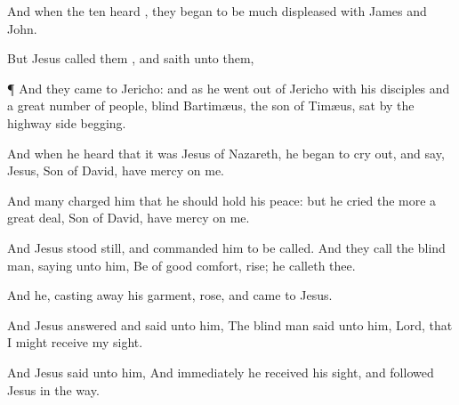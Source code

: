 {

And
when the
ten
heard
{}, they
began to be much
displeased
with
James
and
John.

But
Jesus
called
them
{}, and
saith unto
them,
{}





\par }{\PP {}¶
And they
came
to
Jericho:
and
as
he went
out
of
Jericho
with
his
disciples
and
a
great number of
people,
blind
Bartimæus, the
son of
Timæus,
sat
by the highway
side
begging.

And when he
heard
that it
was
Jesus of
Nazareth, he
began to cry
out,
and
say,
Jesus,
{}
Son of
David, have mercy
on
me.

And
many
charged
him
that he should hold his
peace:
but he
cried the
more a great
deal,
{}
Son of
David, have mercy
on
me.

And
Jesus stood
still, and
commanded
him to be
called.
And they
call the blind
man,
saying unto
him, Be of good
comfort,
rise; he
calleth
thee.

And he, casting
away
his
garment,
rose, and
came
to
Jesus.

And
Jesus
answered and
said unto
him,
{} The blind
man
said unto
him,
Lord,
that I might receive my
sight.

And
Jesus
said unto
him,
{}
And
immediately he received his
sight,
and
followed
Jesus
in the
way.




\par }

